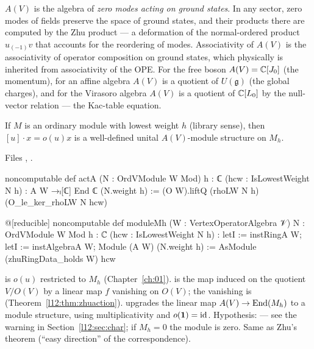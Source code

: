 \begin{physics}
$A(V)$ is the algebra of \emph{zero modes acting on ground states}. In any sector, zero modes of fields preserve
the space of ground states, and their products there are computed by the Zhu product --- a deformation of the
normal-ordered product $u_{(-1)}v$ that accounts for the reordering of modes. Associativity of $A(V)$ is the
associativity of operator composition on ground states, which physically is inherited from associativity of the
OPE. For the free boson $A(V) = {\mathbb{C}}[J_0]$ (the momentum), for an affine algebra $A(V)$ is a quotient of
$U(\mathfrak g)$ (the global charges), and for the Virasoro algebra $A(V)$ is a quotient of ${\mathbb{C}}[L_0]$ by the
null-vector relation --- the Kac-table equation.
\end{physics}

\begin{theorem}\label{l12:thm:moduleMh}
If $M$ is an ordinary module with lowest weight $h$ (library sense), then $[u]\cdot x = o(u)x$ is a well-defined
unital $A(V)$-module structure on $M_h$.
\end{theorem}
\noindent Files ,
.
\begin{leancode}
noncomputable def actA (N : OrdVModule W Mod) {h : ℂ} (hcw : IsLowestWeight N h) :
    A W →ₗ[ℂ] End ℂ (N.weight h) :=
  (O W).liftQ (rhoLW N h) (O_le_ker_rhoLW N hcw)

@[reducible] noncomputable def moduleMh (W : VertexOperatorAlgebra 𝒱) {N : OrdVModule W Mod} {h : ℂ}
    (hcw : IsLowestWeight N h) :
    letI := instRingA W; letI := instAlgebraA W; Module (A W) (N.weight h) :=
  AsModule (zhuRingData_holds W) hcw
\end{leancode}

\begin{dictionary}
 is $o(u)$ restricted to $M_h$ (Chapter~\ref{ch:01}).  is the map
induced on the quotient $V/O(V)$ by a linear map $f$ vanishing on $O(V)$; the vanishing is
 (Theorem~\ref{l12:thm:zhuaction}).  upgrades the linear map $A(V)\to\operatorname{End}(M_h)$
to a module structure, using multiplicativity  and $o(\mathbf{1}) = \mathrm{id}$.
Hypothesis:  --- see the warning in Section~\ref{l12:sec:char}; if $M_h = 0$ the module is
zero. Same as Zhu's theorem (``easy direction'' of the correspondence).
\end{dictionary}

